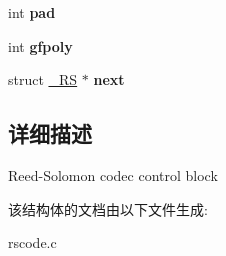 \begin{DoxyCompactItemize}
\item 
\hypertarget{struct___r_s_a10c7fe66a2d97af43c41881c5c24ce92}{int {\bfseries pad}}\label{struct___r_s_a10c7fe66a2d97af43c41881c5c24ce92}

\item 
\hypertarget{struct___r_s_ac8de531510e63159386f598575425c54}{int {\bfseries gfpoly}}\label{struct___r_s_ac8de531510e63159386f598575425c54}

\item 
\hypertarget{struct___r_s_a8399f3b5c7fdcad97fab3f699c9e676b}{struct \hyperlink{struct___r_s}{\-\_\-\-R\-S} $\ast$ {\bfseries next}}\label{struct___r_s_a8399f3b5c7fdcad97fab3f699c9e676b}

\end{DoxyCompactItemize}


\subsection{详细描述}
Reed-\/\-Solomon codec control block 

该结构体的文档由以下文件生成\-:\begin{DoxyCompactItemize}
\item 
rscode.\-c\end{DoxyCompactItemize}
